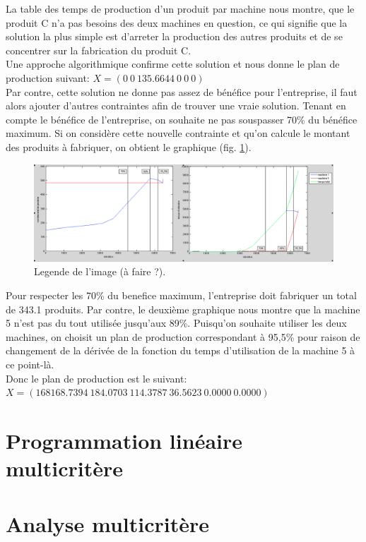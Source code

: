 \documentclass[a4paper, 11pt]{article}
\begin{document}
La table des temps de production d’un produit par machine nous montre, que le
produit C n’a pas besoins des deux machines en question, ce qui signifie que la
solution la plus simple est d’arreter la production des autres produits et de
se concentrer sur la fabrication du produit C. \\
Une approche algorithmique confirme cette solution et nous donne le plan de
production suivant: $X = (0 ~0 ~135.6644 ~0 ~0 ~0)$ \\

Par contre, cette solution ne donne pas assez de bénéfice pour l’entreprise, il
faut alors ajouter d’autres contraintes afin de trouver une vraie solution.
Tenant en compte le bénéfice de l’entreprise, on souhaite ne pas souspasser
70\% du bénéfice maximum. Si on considère cette nouvelle contrainte et qu’on
calcule le montant des produits à fabriquer, on obtient le graphique
(fig. \ref{fig_graph_personnel_temps}).

\begin{figure}[position]
    \begin{center}
        \includegraphics[scale=0.35]{graph_personnel_temps}
        \caption{
            \label{fig_graph_personnel_temps} Legende de l'image (à faire ?).
        }
    \end{center}
\end{figure}

Pour respecter les 70\% du benefice maximum, l’entreprise doit fabriquer un
total de 343.1 produits. Par contre, le deuxième graphique nous montre que la
machine 5 n’est pas du tout utilisée jusqu’aux 89\%. Puisqu’on souhaite
utiliser les deux machines, on choisit un plan de production correspondant à
95,5\% pour raison de changement de la dérivée de la fonction du temps
d’utilisation de la machine 5 à ce point-là. \\

Donc le plan de production est le suivant: \\
$X = (168 168.7394~ 184.0703~ 114.3787~ 36.5623~ 0.0000~ 0.0000)$

\section{Programmation linéaire multicritère}

\section{Analyse multicritère}
\end{document}
